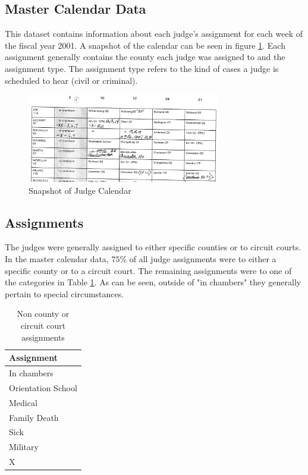 \documentclass[11pt]{article}
\theoremstyle{ModifiedStyle}
\begin{document}
  \subsection{Master Calendar Data}
    This dataset contains information about each judge's assignment for each week of the fiscal year 2001. A snapshot of the calendar can be seen in figure \ref{fig-calendar}. Each assignment generally contains the county each judge was assigned to and the assignment type. The assignment type refers to the kind of cases a judge is scheduled to hear (civil or criminal).
    \begin{figure}[h]
        \centering
        \caption{Snapshot of Judge Calendar}
        \label{fig-calendar}
        \includegraphics[width=0.75\textwidth, keepaspectratio=true]{Figures/Fig4.png}
      \end{figure}

    \subsection{Assignments}
      The judges were generally assigned to either specific counties or to circuit courts. In the master calendar data, $75\%$ of all judge assignments were to either a specific county or to a circuit court. The remaining assignments were to one of the categories in Table \ref{tab-special-assignments}. As can be seen, outside of "in chambers" they generally pertain to special circumstances.

      \begin{table}[H]
        \centering
        \caption{Non county or circuit court assignments}
        \label{tab-special-assignments}
        \begin{tabular}{l}
        \hline
        \textbf{Assignment}                      \\ \hline
        In chambers        \\
        Orientation School \\
        Medical            \\
        Family Death       \\
        Sick              \\
        Military           \\
        X                  \\ \hline
        \end{tabular}
      \end{table}
\end{document}
